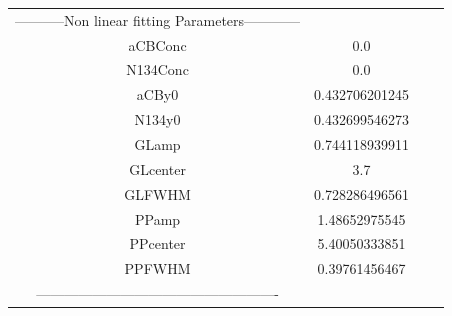 \documentclass{article}
\begin{document}
\begin{tabular}{c c c c}

-----------Non linear fitting Parameters------------\\
aCBConc    &0.0\\
N134Conc   &0.0\\
aCBy0      &0.432706201245\\
N134y0     &0.432699546273\\
GLamp      &0.744118939911\\
GLcenter   &3.7\\
GLFWHM     &0.728286496561\\
PPamp      &1.48652975545\\
PPcenter   &5.40050333851\\
PPFWHM     &0.39761456467\\
----------------------------------------------------\\


\end{tabular}
\end{document}
